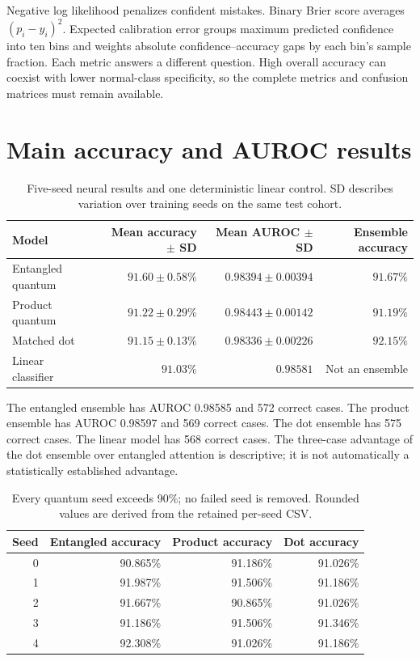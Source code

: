 \documentclass[11pt,a4paper]{report}
\begin{document}
Negative log likelihood penalizes confident mistakes. Binary Brier score averages $(p_i-y_i)^2$. Expected calibration error groups maximum predicted confidence into ten bins and weights absolute confidence--accuracy gaps by each bin's sample fraction. Each metric answers a different question. High overall accuracy can coexist with lower normal-class specificity, so the complete metrics and confusion matrices must remain available.

\section{Main accuracy and AUROC results}
\begin{table}[htbp]\centering\small
\begin{tabular}{lrrr}\toprule
Model & Mean accuracy $\pm$ SD & Mean AUROC $\pm$ SD & Ensemble accuracy\\\midrule
Entangled quantum & $91.60\pm0.58\%$ & $0.98394\pm0.00394$ & $91.67\%$\\
Product quantum & $91.22\pm0.29\%$ & $0.98443\pm0.00142$ & $91.19\%$\\
Matched dot & $91.15\pm0.13\%$ & $0.98336\pm0.00226$ & $92.15\%$\\
Linear classifier & $91.03\%$ & $0.98581$ & Not an ensemble\\\bottomrule
\end{tabular}
\caption{Five-seed neural results and one deterministic linear control. SD describes variation over training seeds on the same test cohort.}
\end{table}

The entangled ensemble has AUROC 0.98585 and 572 correct cases. The product ensemble has AUROC 0.98597 and 569 correct cases. The dot ensemble has 575 correct cases. The linear model has 568 correct cases. The three-case advantage of the dot ensemble over entangled attention is descriptive; it is not automatically a statistically established advantage.

\begin{table}[htbp]\centering
\begin{tabular}{rrrr}\toprule
Seed & Entangled accuracy & Product accuracy & Dot accuracy\\\midrule
0 & 90.865\% & 91.186\% & 91.026\%\\
1 & 91.987\% & 91.506\% & 91.186\%\\
2 & 91.667\% & 90.865\% & 91.026\%\\
3 & 91.186\% & 91.506\% & 91.346\%\\
4 & 92.308\% & 91.026\% & 91.186\%\\\bottomrule
\end{tabular}
\caption{Every quantum seed exceeds 90\%; no failed seed is removed. Rounded values are derived from the retained per-seed CSV.}
\end{table}
\end{document}
